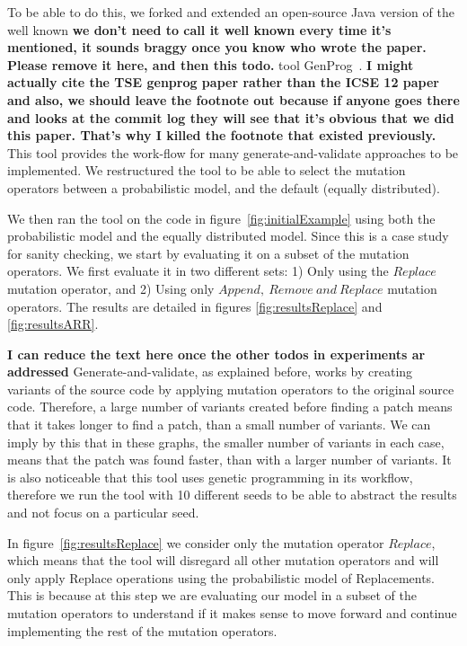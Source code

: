 \documentclass[conference]{IEEEtran}
\newcommand{\todo}[1]
  {{\scriptsize \textbf{\color{red} {#1}}}}
\begin{document}
To be able to do this, we forked and extended an open-source Java version of the 
well known\todo{we don't need to call it well known every time it's mentioned,
  it sounds braggy once you know who wrote the paper.  Please remove it here,
  and then this todo.} tool GenProg~\cite{legoues12}.\todo{I might actually cite the TSE
  genprog paper rather than the ICSE 12 paper and also, we should leave the
  footnote out because if anyone goes there and looks at the commit log they
  will see that it's obvious that we did this paper.  That's why I killed the
  footnote that existed previously.} This tool provides the work-flow 
for many generate-and-validate approaches to be implemented. We restructured the 
tool to be able to select the mutation operators between a 
probabilistic model, and the default (equally distributed).

We then ran the tool on the code in figure~\ref{fig:initialExample} using both 
the probabilistic model and the equally distributed model. Since this is a 
case study for sanity checking, we start by evaluating it on a subset of 
the mutation operators. We first evaluate it in two different sets: 1) Only using the $Replace$ mutation operator, and 2) Using only $Append,~
Remove~and~Replace$ mutation operators. The results are detailed in figures 
\ref{fig:resultsReplace} and \ref{fig:resultsARR}. 

\todo{I can reduce the text here once the other todos in experiments ar addressed}
Generate-and-validate, as explained before, works by creating variants of the 
source code by applying mutation operators to the original source code. 
Therefore, a large number of variants created before finding a patch means that 
it takes longer to find a patch, than a small number of variants. We can imply by this 
that in these graphs, the smaller number of variants in each case, means that 
the patch was found faster, than with a larger number of variants. It is also 
noticeable that this tool uses genetic programming in its workflow, therefore we 
run the tool with 10 different seeds to be able to abstract the results 
and not focus on a particular seed.

In figure~\ref{fig:resultsReplace} we consider only the mutation operator 
$Replace$, which means that the tool will disregard all other mutation 
operators and will only apply Replace operations using the probabilistic model 
of Replacements. This is because at this step we are evaluating our model in a 
subset of the mutation operators to understand if it makes sense to move forward and 
continue implementing the rest of the mutation operators.
\end{document}
